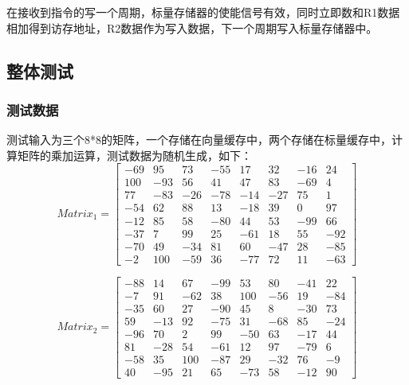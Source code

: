 \documentclass[UTF8]{ctexart}
\begin{document}
在接收到指令的写一个周期，标量存储器的使能信号有效，同时立即数和R1数据相加得到访存地址，R2数据作为写入数据，下一个周期写入标量存储器中。

\subsection{整体测试}
\subsubsection{测试数据}
测试输入为三个8*8的矩阵，一个存储在向量缓存中，两个存储在标量缓存中，计算矩阵的乘加运算，测试数据为随机生成，如下：
\begin{equation}
Matrix_1
=
\left[
\begin{array}{cccccccc}
    -69 & 95  & 73  & -55 & 17  & 32  & -16 & 24  \\
    100 & -93 & 56  & 41  & 47  & 83  & -69 & 4   \\
    77  & -83 & -26 & -78 & -14 & -27 & 75  & 1   \\
    -54 & 62  & 88  & 13  & -18 & 39  & 0   & 97  \\
    -12 & 85  & 58  & -80 & 44  & 53  & -99 & 66  \\
    -37 & 7   & 99  & 25  & -61 & 18  & 55  & -92 \\
    -70 & 49  & -34 & 81  & 60  & -47 & 28  & -85 \\
    -2  & 100 & -59 & 36  & -77 & 72  & 11  & -63 
\end{array}
\right]
\end{equation}

\begin{equation}
Matrix_2
=
\left[
\begin{array}{cccccccc}
    -88 & 14  & 67  & -99 & 53  & 80  & -41 & 22  \\
    -7  & 91  & -62 & 38  & 100 & -56 & 19  & -84 \\
    -35 & 60  & 27  & -90 & 45  & 8   & -30 & 73  \\
    59  & -13 & 92  & -75 & 31  & -68 & 85  & -24 \\
    -96 & 70  & 2   & 99  & -50 & 63  & -17 & 44  \\
    81  & -28 & 54  & -61 & 12  & 97  & -79 & 6   \\
    -58 & 35  & 100 & -87 & 29  & -32 & 76  & -9  \\
    40  & -95 & 21  & 65  & -73 & 58  & -12 & 90
\end{array}
\right]
\end{equation}
\end{document}
